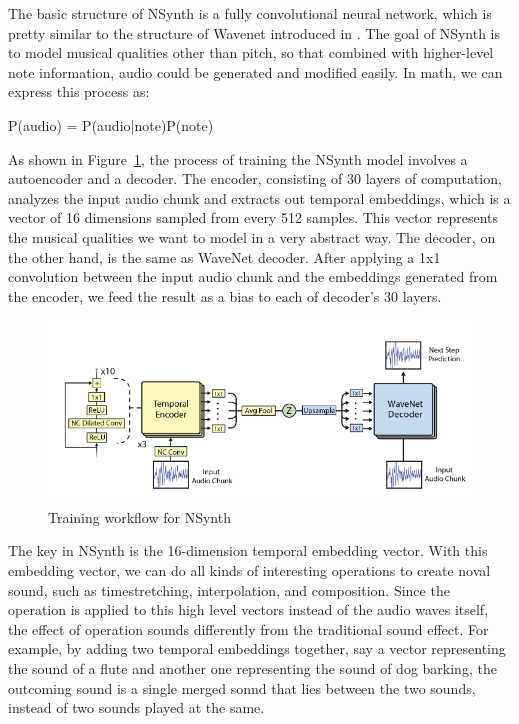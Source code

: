 \documentclass[jou]{apa6}
\begin{document}
The basic structure of NSynth is a fully convolutional neural network, which is pretty similar to the structure of Wavenet introduced in \textcite{oord2016wavenet}. The goal of NSynth is to model musical qualities other than pitch, so that combined with higher-level note information, audio could be generated and modified easily. In math, we can express this process as:

\centerline{P(audio) = P(audio|note)P(note)}

As shown in Figure~\ref{fig:Figure2}, the process of training the NSynth model involves a autoencoder and a decoder. The encoder, consisting of 30 layers of computation, analyzes the input audio chunk and extracts out temporal embeddings, which is a vector of 16 dimensions sampled from every 512 samples. This vector represents the musical qualities we want to model in a very abstract way. The decoder, on the other hand, is the same as WaveNet decoder. After applying a 1x1 convolution between the input audio chunk and the embeddings generated from the encoder, we feed the result as a bias to each of decoder's 30 layers.

\begin{figure}[h!]
    \includegraphics[width=\linewidth]{nsynth.png}
    \caption{Training workflow for NSynth}
    \label{fig:Figure2}
\end{figure}

The key in NSynth is the 16-dimension temporal embedding vector. With this embedding vector, we can do all kinds of interesting operations to create noval sound, such as timestretching, interpolation, and composition. Since the operation is applied to this high level vectors instead of the audio waves itself, the effect of operation sounds differently from the traditional sound effect. For example, by adding two temporal embeddings together, say a vector representing the sound of a flute and another one representing the sound of dog barking, the outcoming sound is a single merged sonnd that lies between the two sounds, instead of two sounds played at the same.
\end{document}
